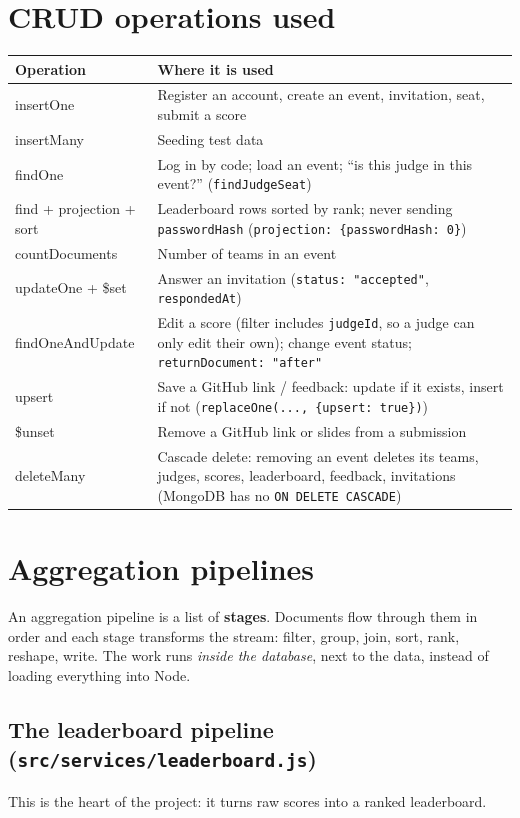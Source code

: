 \documentclass[11pt,a4paper]{article}
\begin{document}
\section{CRUD operations used}
\begin{longtable}{@{}>{\ttfamily}p{3.6cm}p{11.4cm}@{}}
\toprule
\normalfont\textbf{Operation} & \textbf{Where it is used}\\
\midrule
\endhead
insertOne & Register an account, create an event, invitation, seat, submit a score \\
insertMany & Seeding test data \\
findOne & Log in by code; load an event; ``is this judge in this event?'' (\texttt{findJudgeSeat}) \\
find + projection + sort & Leaderboard rows sorted by rank; never sending \texttt{passwordHash} (\texttt{projection: \{passwordHash: 0\}}) \\
countDocuments & Number of teams in an event \\
updateOne + \$set & Answer an invitation (\texttt{status: "accepted"}, \texttt{respondedAt}) \\
findOneAndUpdate & Edit a score (filter includes \texttt{judgeId}, so a judge can only edit their own); change event status; \texttt{returnDocument: "after"} \\
upsert & Save a GitHub link / feedback: update if it exists, insert if not (\texttt{replaceOne(..., \{upsert: true\})}) \\
\$unset & Remove a GitHub link or slides from a submission \\
deleteMany & Cascade delete: removing an event deletes its teams, judges, scores, leaderboard, feedback, invitations (MongoDB has no \texttt{ON DELETE CASCADE}) \\
\bottomrule
\end{longtable}

\section{Aggregation pipelines}
An aggregation pipeline is a list of \textbf{stages}. Documents flow through them in order and each stage transforms
the stream: filter, group, join, sort, rank, reshape, write. The work runs \emph{inside the database}, next to the
data, instead of loading everything into Node.

\subsection{The leaderboard pipeline (\texttt{src/services/leaderboard.js})}
This is the heart of the project: it turns raw scores into a ranked leaderboard.
\end{document}
